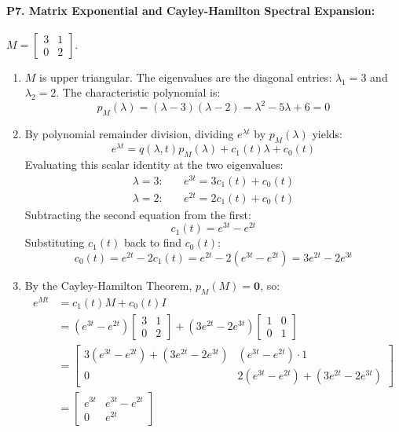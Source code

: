 \paragraph{P7. Matrix Exponential and Cayley-Hamilton Spectral Expansion:}
$M = \begin{bmatrix} 3 & 1 \\ 0 & 2 \end{bmatrix}$.
\begin{enumerate}[label=(\alph*)]
    \item $M$ is upper triangular. The eigenvalues are the diagonal entries: $\lambda_1 = 3$ and $\lambda_2 = 2$.
    The characteristic polynomial is:
    \[
    p_M(\lambda) = (\lambda - 3)(\lambda - 2) = \lambda^2 - 5\lambda + 6 = 0
    \]
    \item By polynomial remainder division, dividing $e^{\lambda t}$ by $p_M(\lambda)$ yields:
    \[
    e^{\lambda t} = q(\lambda, t) p_M(\lambda) + c_1(t)\lambda + c_0(t)
    \]
    Evaluating this scalar identity at the two eigenvalues:
    \begin{align*}
    \lambda = 3: \quad & e^{3t} = 3 c_1(t) + c_0(t) \\
    \lambda = 2: \quad & e^{2t} = 2 c_1(t) + c_0(t)
    \end{align*}
    Subtracting the second equation from the first:
    \[
    c_1(t) = e^{3t} - e^{2t}
    \]
    Substituting $c_1(t)$ back to find $c_0(t)$:
    \[
    c_0(t) = e^{2t} - 2 c_1(t) = e^{2t} - 2(e^{3t} - e^{2t}) = 3e^{2t} - 2e^{3t}
    \]
    \item By the Cayley-Hamilton Theorem, $p_M(M) = \mathbf{0}$, so:
    \begin{align*}
    e^{Mt} &= c_1(t) M + c_0(t) I \\
    &= (e^{3t} - e^{2t}) \begin{bmatrix} 3 & 1 \\ 0 & 2 \end{bmatrix} + (3e^{2t} - 2e^{3t}) \begin{bmatrix} 1 & 0 \\ 0 & 1 \end{bmatrix} \\
    &= \begin{bmatrix} 3(e^{3t} - e^{2t}) + (3e^{2t} - 2e^{3t}) & (e^{3t} - e^{2t}) \cdot 1 \\ 0 & 2(e^{3t} - e^{2t}) + (3e^{2t} - 2e^{3t}) \end{bmatrix} \\
    &= \begin{bmatrix} e^{3t} & e^{3t} - e^{2t} \\ 0 & e^{2t} \end{bmatrix}

\end{align*}
\end{enumerate}
